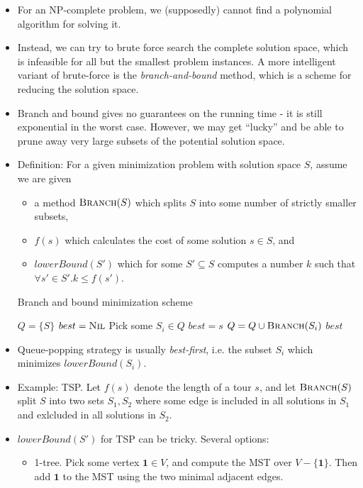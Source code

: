 \begin{itemize}
\item For an NP-complete problem, we (supposedly) cannot find a
  polynomial algorithm for solving it.
\item Instead, we can try to brute force search the complete solution
  space, which is infeasible for all but the smallest problem
  instances. A more intelligent variant of brute-force is the
  \emph{branch-and-bound} method, which is a scheme for reducing the
  solution space.
\item Branch and bound gives no guarantees on the running time - it is
  still exponential in the worst case. However, we may get ``lucky''
  and be able to prune away very large subsets of the potential
  solution space.
\item Definition: For a given minimization problem with solution space
  $S$, assume we are given
  \begin{itemize}
  \item a method $\textsc{Branch}(S)$ which splits $S$ into some
    number of strictly smaller subsets,
  \item $f(s)$ which calculates the cost of some solution $s \in S$,
    and
  \item $lowerBound(S')$ which for some $S' \subseteq S$ computes a
    number $k$ such that $\forall s' \in S'. k \leq f(s')$.
  \end{itemize}
  \begin{algorithm}
    \caption{Branch and bound minimization scheme}
    \begin{algorithmic}[1]
        \State $Q = \{S\}$
        \State $best = \textsc{Nil}$
          \State Pick some $S_i \in Q$
              \State $best = s$
            \EndIf
          \Else
              \State $Q = Q \cup \textsc{Branch}(S_i)$
            \EndIf
          \EndIf
        \EndWhile
        \Return $best$
      \EndProcedure
    \end{algorithmic}
  \end{algorithm}
\item Queue-popping strategy is usually \emph{best-first}, i.e. the
  subset $S_i$ which minimizes $lowerBound(S_i)$.
\item Example: TSP. Let $f(s)$ denote the length of a tour $s$, and
  let $\textsc{Branch}(S)$ split $S$ into two sets $S_1, S_2$ where
  some edge is included in all solutions in $S_1$ and exlcluded in all
  solutions in $S_2$.
\item $lowerBound(S')$ for TSP can be tricky. Several options:
  \begin{itemize}
  \item 1-tree. Pick some vertex $\mathbf{1} \in V$, and compute the
    MST over $V - \{ \mathbf{1} \}$. Then add $\mathbf{1}$ to the MST
    using the two minimal adjacent edges.


\end{itemize}
\end{itemize}
